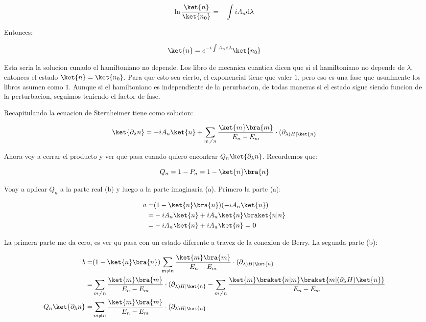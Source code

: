 \documentclass[11pt,fleqn]{book}
\begin{document}
\begin{equation}
    \ln{\frac{\ket{n}}{\ket{n_{0}}}}=-\int iA_{n}\mathrm{d}\lambda
\end{equation}

Entonces:

\begin{equation}
    \ket{n}=e^{-i\int A_{n}\mathrm{d}\lambda}\ket{n_{0}}
\end{equation}

Esta seria la solucion cunado el hamiltoniano no depende. Los libro de mecanica cuantica dicen que si el hamiltoniano no depende de $\lambda$, entonces el estado $\ket{n}=\ket{n_{0}}$. Para que esto sea cierto, el exponencial tiene que valer $1$, pero eso es una fase que usualmente los libros asumen como $1$. Aunque si el hamiltoniano es independiente de la perurbacion, de todas maneras si el estado sigue siendo funcion de la perturbacion, seguimos teniendo el factor de fase.

Recapitulando la ecuacion de Sternheimer tiene como solucion:

\begin{equation}
    \ket{\partial_{\lambda}n}=-iA_{n}\ket{n}+\sum_{m\neq n}\frac{\ket{m}\bra{m}}{E_{n}-E_{m}}\cdot(\partial_{\lambda)H|\ket{n}}
\end{equation}

Ahora voy a cerrar el producto y ver que pasa cuando quiero encontrar $Q_{n}\ket{\partial_{\lambda}n}$. Recordemos que:

\begin{equation*}
    Q_{n}=1-P_{n}=1-\ket{n}\bra{n}
\end{equation*}

Voay a aplicar $Q_{n}$ a la parte real (b) y luego a la parte imaginaria (a). Primero la parte (a):

\begin{equation}
    \begin{split}
        a=&(1-\ket{n}\bra{n})(-iA_{n}\ket{n})\\
        =&-iA_{n}\ket{n}+iA_{n}\ket{n}\braket{n|n}\\
        =&-iA_{n}\ket{n}+iA_{n}\ket{n}=0
    \end{split}
\end{equation}

La primera parte me da cero, es ver qu pasa con un estado diferente a travez de la conexion de Berry. La segunda parte (b):

\begin{equation}
    \begin{split}
        b=&(1-\ket{n}\bra{n})\sum_{m\neq n}\frac{\ket{m}\bra{m}}{E_{n}-E_{m}}\cdot(\partial_{\lambda)H|\ket{n}}\\
        =&\sum_{m\neq n}\frac{\ket{m}\bra{m}}{E_{n}-E_{m}}\cdot(\partial_{\lambda)H|\ket{n}}-\sum_{m\neq n}\frac{\ket{m}\braket{n|m}\braket{m|(\partial_{\lambda}H)\ket{n}}}{E_{n}-E_{m}}\\
        Q_{n}\ket{\partial_{\lambda}n}=&\sum_{m\neq n}\frac{\ket{m}\bra{m}}{E_{n}-E_{m}}\cdot(\partial_{\lambda)H|\ket{n}}
    \end{split}
\end{equation}
\end{document}
